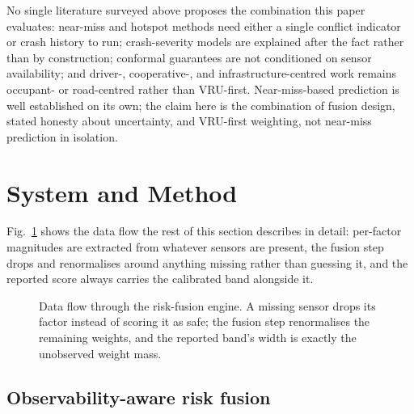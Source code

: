 \documentclass[journal]{IEEEtran}
\begin{document}
No single literature surveyed above proposes the combination this paper evaluates: near-miss and hotspot methods need either a single conflict indicator or crash history to run; crash-severity models are explained after the fact rather than by construction; conformal guarantees are not conditioned on sensor availability; and driver-, cooperative-, and infrastructure-centred work remains occupant- or road-centred rather than VRU-first. Near-miss-based prediction is well established on its own; the claim here is the combination of fusion design, stated honesty about uncertainty, and VRU-first weighting, not near-miss prediction in isolation.

\section{System and Method}

Fig.~\ref{fig:architecture} shows the data flow the rest of this section describes in detail: per-factor magnitudes are extracted from whatever sensors are present, the fusion step drops and renormalises around anything missing rather than guessing it, and the reported score always carries the calibrated band alongside it.

\begin{figure}[t]
\centering
{}
\caption{Data flow through the risk-fusion engine. A missing sensor drops its factor instead of scoring it as safe; the fusion step renormalises the remaining weights, and the reported band's width is exactly the unobserved weight mass.}
\label{fig:architecture}
\end{figure}

\subsection{Observability-aware risk fusion}
\end{document}
